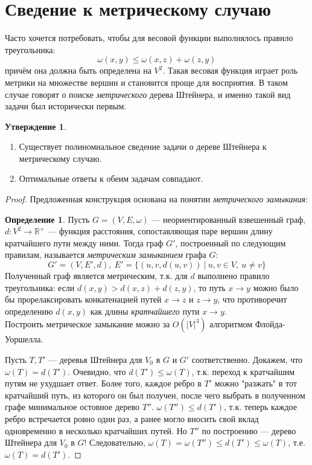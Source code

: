 \documentclass[11pt,a4paper]{report}
\def\Real{\mathbb{R}}
\def\le{\leqslant}
\theoremstyle{definition}
\theoremstyle{definition}
\newtheorem{preposition}{Утверждение}[section]
\theoremstyle{definition}
\newtheorem{definition}{Определение}[section]
\begin{document}
	\section{Сведение к метрическому случаю}
		Часто хочется потребовать, чтобы для весовой функции выполнялось правило треугольника:
		$$
			\omega(x, y) \le \omega(x, z) + \omega(z, y) 		
		$$
		причём она должна быть определена на $V^2$. Такая весовая функция играет роль метрики на множестве вершин и становится проще для восприятия. В таком случае говорят о поиске \textit{метрического} дерева Штейнера, и именно такой вид задачи был исторически первым.
		\begin{preposition}$  $
			\begin{enumerate}
				\item Существует полиномиальное сведение задачи о дереве Штейнера к метрическому случаю.
				\item Оптимальные ответы к обеим задачам совпадают.
			\end{enumerate}
		\end{preposition}
		\begin{proof}
			Предложенная конструкция основана на понятии \textit{метрического замыкания}:
			\begin{definition}
				Пусть $ G = (V, E, \omega) $ — неориентированный взвешенный граф, $d: V^2 \to \Real^{+} $ — функция расстояния, сопоставляющая паре вершин длину кратчайшего пути между ними. Тогда граф $G'$, построенный по следующим правилам, называется \textit{метрическим замыканием} графа $G$:
				$$
					G' = (V, E', d),\ E' = \{ (u, v, d(u, v))\ |\ u, v \in V,\ u \neq v \}
				$$
				Полученный граф является метрическим, т.к. для $d$ выполнено правило треугольника: если $ d(x, y) > d(x, z) + d(z, y) $, то путь $x \to y$ можно было бы прорелаксировать конкатенацией путей $x \to z$ и $z \to y$, что противоречит определению $d(x, y)$ как длины \textit{кратчайшего} пути $x \to y$.\\
				Построить метрическое замыкание можно за $O(|V|^3)$ алгоритмом Флойда-Уоршелла. 
			\end{definition}
			\noindent Пусть $T, T'$ — деревья Штейнера для $V_0$ в $ G $ и $ G' $ соответственно. Докажем, что $\omega(T) = d(T')$. Очевидно, что $ d(T') \le \omega(T) $, т.к. переход к кратчайшим путям не ухудшает ответ. Более того, каждое ребро в $T'$ можно "разжать" в тот кратчайший путь, из которого он был получен, после чего выбрать в полученном графе минимальное остовное дерево $T''$. $\omega(T'') \le d(T')$, т.к. теперь каждое ребро встречается ровно один раз, а ранее могло вносить свой вклад одновременно в несколько кратчайших путей. Но $T''$ по построению — дерево Штейнера для $V_0$ в $G$! Следовательно, $ \omega(T) = \omega(T'') \le d(T') \le \omega(T)$, т.е. $\omega(T) = d(T')$.
 		\end{proof}
\end{document}
